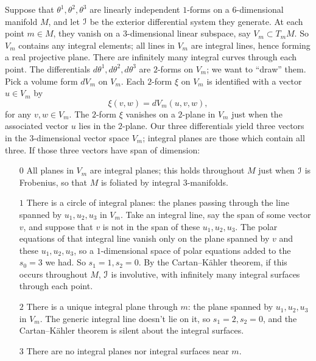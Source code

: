 \begin{example}
Suppose that \(\theta^1,\theta^2,\theta^3\) are linearly independent \(1\)-forms on a \(6\)-dimensional manifold \(M\), and let \(\mathcal{I}\) be the exterior differential system they generate.
At each point \(m\in M\), they vanish on a \(3\)-dimensional linear subspace, say \(V_m\subset T_m M\).
So \(V_m\) contains any integral elements; all lines in \(V_m\) are integral lines, hence forming a real projective plane.
There are infinitely many integral curves through each point.
The differentials \(d\theta^1,d\theta^2,d\theta^3\) are \(2\)-forms on \(V_m\); we want to ``draw'' them. 
Pick a volume form \(dV_m\) on \(V_m\).
Each \(2\)-form \(\xi\) on \(V_m\) is identified with a vector \(u\in V_m\) by
\[
\xi(v,w)=dV_m(u,v,w),
\]
for any \(v,w\in V_m\).
The \(2\)-form \(\xi\) vanishes on a \(2\)-plane in \(V_m\) just when the associated vector \(u\) lies in the \(2\)-plane.
Our three differentials yield three vectors in the \(3\)-dimensional vector space \(V_m\); integral planes are those which contain all three. 
If those three vectors have span of dimension:
\begin{itemize}
\item[$0$]
All planes in \(V_m\) are integral planes; this holds throughout \(M\) just when \(\mathcal{I}\) is Frobenius, so that \(M\) is foliated by integral \(3\)-manifolds.
\item[$1$]
There is a circle of integral planes: the planes passing through the line spanned by \(u_1,u_2,u_3\) in \(V_m\).
Take an integral line, say the span of some vector \(v\), and suppose that \(v\) is not in the span of these \(u_1,u_2,u_3\).
The polar equations of that integral line vanish only on the plane spanned by \(v\) and these \(u_1,u_2,u_3\), so a \(1\)-dimensional space of polar equations added to the \(s_0=3\) we had.
So \(s_1=1,s_2=0\).
By the Cartan--K\"ahler theorem, if this occurs throughout \(M\), \(\mathcal{I}\) is involutive, with infinitely many integral surfaces through each point.
\item[$2$]
There is a unique integral plane through \(m\): the plane spanned by \(u_1,u_2,u_3\) in \(V_m\).
The generic integral line doesn't lie on it, so \(s_1=2,s_2=0\), and the Cartan--K\"ahler theorem is silent about the integral surfaces.
\item[$3$]
There are no integral planes nor integral surfaces near \(m\).
\end{itemize}
\end{example}
